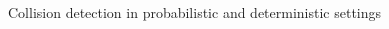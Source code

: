                  \begin{figure}[!t]
                   \begin{center}
                     \begin{subfigmatrix}{2}
                     \end{subfigmatrix}
                     \caption{Collision detection in probabilistic and deterministic settings}
                     \label{fig:prob_collision1}
                   \end{center}
                 \end{figure}

